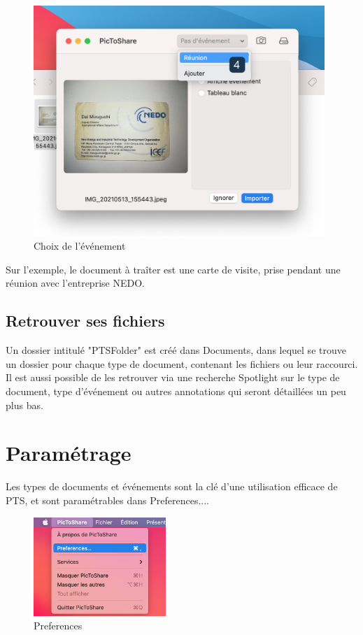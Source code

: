 \documentclass[a4paper,11pt]{article}
\begin{document}
	\begin{figure}[h]
		\centering
		\includegraphics[width=11cm]{Importation_event}
		\caption{Choix de l'événement}
	\end{figure}


	Sur l'exemple, le document à traîter est une carte de visite, prise pendant une réunion avec l'entreprise NEDO.

	\subsection{Retrouver ses fichiers}
	Un dossier intitulé "PTSFolder" est créé dans Documents, dans lequel se trouve un dossier pour chaque type de document, contenant les fichiers ou leur raccourci. Il est aussi possible de les retrouver via une recherche Spotlight sur le type de document, type d'événement ou autres annotations qui seront détaillées un peu plus bas.



	\section{Paramétrage}
	Les types de documents et événements sont la clé d'une utilisation efficace de PTS, et sont paramétrables dans Preferences....
	\begin{figure}[h!]
		\centering
		\includegraphics[width=5cm]{Preferences}
		\caption{Preferences}
	\end{figure}
\end{document}
